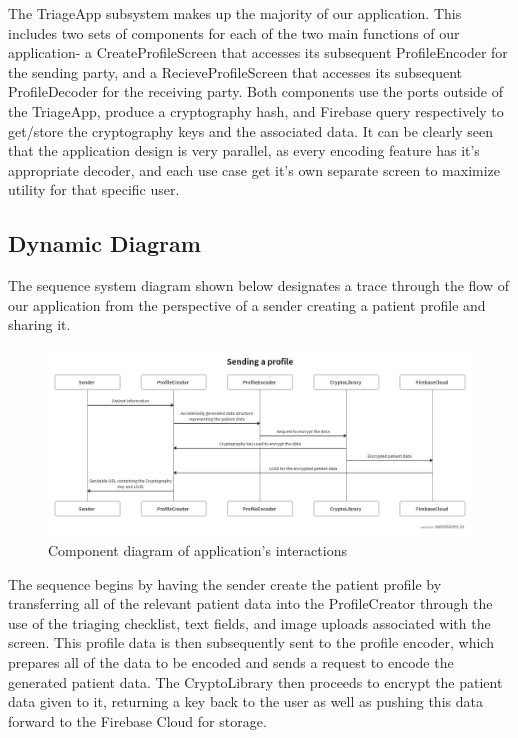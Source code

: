 \documentclass[11pt,letterpaper]{article}
\begin{document}
The TriageApp subsystem makes up the majority of our application. This includes two sets of components for each of the two main functions of our application- a CreateProfileScreen that accesses its subsequent ProfileEncoder for the sending party, and a RecieveProfileScreen that accesses its subsequent ProfileDecoder for the receiving party. Both components use the ports outside of the TriageApp, produce a cryptography hash, and Firebase query respectively to get/store the cryptography keys and the associated data. It can be clearly seen that the application design is very parallel, as every encoding feature has it's appropriate decoder, and each use case get it's own separate screen to maximize utility for that specific user.

\subsection{Dynamic Diagram}

The sequence system diagram shown below designates a trace through the flow of our application from the perspective of a sender creating a patient profile and sharing it. 

\begin{landscape}
\begin{figure}
    \centering
    \includegraphics[width=8in]{component-sequence.png}
    \caption{Component diagram of application's interactions}
    \label{a}
\end{figure}
\end{landscape}

The sequence begins by having the sender create the patient profile by transferring all of the relevant patient data into the ProfileCreator through the use of the triaging checklist, text fields, and image uploads associated with the screen. This profile data is then subsequently sent to the profile encoder, which prepares all of the data to be encoded and sends a request to encode the generated patient data. The CryptoLibrary then proceeds to encrypt the patient data given to it, returning a key back to the user as well as pushing this data forward to the Firebase Cloud for storage. 
\end{document}
